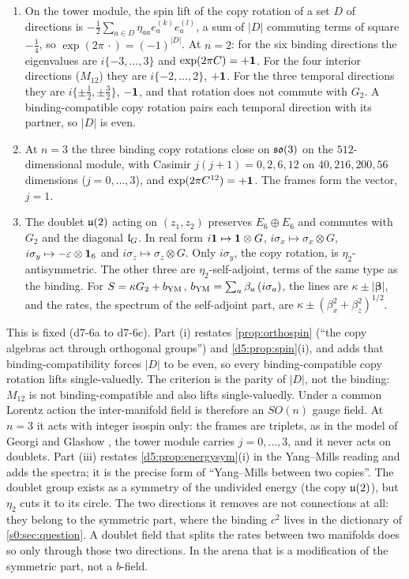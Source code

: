 \begin{proposition}
\label{d7:prop:isospin}
\begin{enumerate}[label=(\roman*),leftmargin=2.2em]
\item On the tower module, the spin lift of the copy rotation of a set $D$ of directions is $-\tfrac12\sum_{a\in D}\eta_{aa}e^{(k)}_ae^{(l)}_a$, a sum of $|D|$
commuting terms of square $-\tfrac14$, so $\exp(2\pi\,\cdot)=(-1)^{|D|}$. At $n=2$: for the six binding directions the eigenvalues are $i\{-3,\dots,3\}$ and
$\exp(2\pi C)=+\mathbf 1$. For the four interior directions ($M_{12}$) they are $i\{-2,\dots,2\}$, $+\mathbf 1$. For the three temporal directions they are
$i\{\pm\tfrac12,\pm\tfrac32\}$, $-\mathbf 1$, and that rotation does not commute with $G_2$. A binding-compatible copy rotation pairs each temporal direction with
its partner, so $|D|$ is even.
\item At $n=3$ the three binding copy rotations close on $\mathfrak{so}(3)$ on the $512$-dimensional module, with Casimir $j(j+1)=0,2,6,12$ on $40,216,200,56$
dimensions ($j=0,\dots,3$), and $\exp(2\pi C^{12})=+\mathbf 1$. The frames form the vector, $j=1$.
\item The doublet $\mathfrak{u}(2)$ acting on $(z_1,z_2)$ preserves $E_6\oplus E_6$ and commutes with $G_2$ and the diagonal $\mathfrak l_G$. In real form $i\mathbf 1\mapsto\mathbf 1\otimes G$,
$i\sigma_x\mapsto\sigma_x\otimes G$, $i\sigma_y\mapsto-\varepsilon\otimes\mathbf 1_6$ and $i\sigma_z\mapsto\sigma_z\otimes G$. Only $i\sigma_y$, the copy rotation, is
$\eta_2$-antisymmetric. The other three are $\eta_2$-self-adjoint, terms of the same type as the binding. For $S=\kappa G_2+b_{\rm YM}$,
$b_{\rm YM}=\sum_a\beta_a\,(i\sigma_a)$, the lines are $\kappa\pm|\boldsymbol\beta|$, and the rates, the spectrum of the self-adjoint part, are
$\kappa\pm(\beta_x^2+\beta_z^2)^{1/2}$.
\end{enumerate}
\end{proposition}

This is fixed (d7-6a to d7-6c). Part (i) restates \cref{prop:orthospin} (``the copy algebras act through orthogonal groups'') and
\cref{d5:prop:spin}(i), and adds that binding-compatibility forces $|D|$ to be even, so every binding-compatible copy rotation lifts single-valuedly. The criterion is the parity of $|D|$, not the binding: $M_{12}$ is not binding-compatible and also lifts single-valuedly. Under a common Lorentz action the inter-manifold field
is therefore an $SO(n)$ gauge field. At $n=3$ it acts with integer isospin only: the frames are triplets, as in the model of Georgi and Glashow \cite{GeorgiGlashow72}, the tower module carries $j=0,\dots,3$, and it never acts on
doublets. Part (iii) restates \cref{d5:prop:energysym}(i) in the Yang--Mills reading and adds the spectra; it is the precise form of
``Yang--Mills between two copies''. The doublet group exists as a symmetry of the undivided energy
(the copy $\mathfrak{u}(2)$), but $\eta_2$ cuts it to its circle. The two directions it removes are not connections at all:
they belong to the symmetric part, where the binding $c^2$ lives in the dictionary of \cref{s0:sec:question}. A doublet field that splits the
rates between two manifolds does so only through those two directions. In the arena that is a modification of the symmetric part, not a
$b$-field.


